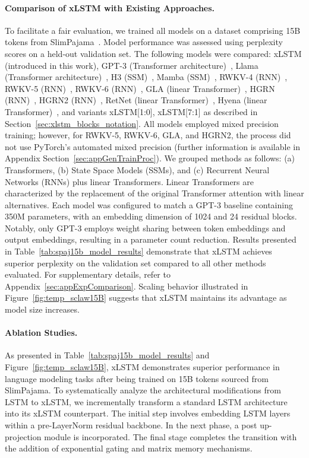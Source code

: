 \paragraph{Comparison of xLSTM with Existing Approaches.} To facilitate a fair evaluation, we trained all models on a dataset comprising 15B tokens from SlimPajama~\citep{Soboleva:23}. Model performance was assessed using perplexity scores on a held-out validation set. The following models were compared: xLSTM (introduced in this work), GPT-3 (Transformer architecture)~\citep{Brown:20short}, Llama (Transformer architecture)~\citep{Touvron:23arxiv}, H3 (SSM)~\citep{Fu:23}, Mamba (SSM)~\citep{Gu:24arxiv}, RWKV-4 (RNN)~\citep{Peng:23arxivshort}, RWKV-5 (RNN)~\citep{Peng:24arxivshort}, RWKV-6 (RNN)~\citep{Peng:24arxivshort}, GLA (linear Transformer)~\citep{Yang:23arxiv}, HGRN (RNN)~\citep{Qin:23}, HGRN2 (RNN)~\citep{Qin:24arxiv}, RetNet (linear Transformer)~\citep{Sun:23arxiv}, Hyena (linear Transformer)~\citep{Poli:23}, and variants xLSTM[1:0], xLSTM[7:1] as described in Section~\ref{sec:xlstm_blocks_notation}. 
All models employed mixed precision training; however, for RWKV-5, RWKV-6, GLA, and HGRN2, the process did not use PyTorch's automated mixed precision (further information is available in Appendix Section~\ref{sec:appGenTrainProc}).
We grouped methods as follows: (a) Transformers, (b) State Space Models (SSMs), and (c) Recurrent Neural Networks (RNNs) plus linear Transformers. Linear Transformers are characterized by the replacement of the original Transformer attention with linear alternatives. Each model was configured to match a GPT-3 baseline containing 350M parameters, with an embedding dimension of 1024 and 24 residual blocks. Notably, only GPT-3 employs weight sharing between token embeddings and output embeddings, resulting in a parameter count reduction. Results presented in Table~\ref{tab:spaj15b_model_results} demonstrate that xLSTM achieves superior perplexity on the validation set compared to all other methods evaluated. For supplementary details, refer to Appendix~\ref{sec:appExpComparison}.
Scaling behavior illustrated in Figure~\ref{fig:temp_sclaw15B} suggests that xLSTM maintains its advantage as model size increases.

\paragraph{Ablation Studies.}
As presented in Table~\ref{tab:spaj15b_model_results} and Figure~\ref{fig:temp_sclaw15B}, xLSTM demonstrates superior performance in language modeling tasks after being trained on 15B tokens sourced from SlimPajama. To systematically analyze the architectural modifications from LSTM to xLSTM, we incrementally transform a standard LSTM architecture into its xLSTM counterpart. The initial step involves embedding LSTM layers within a pre-LayerNorm residual backbone. In the next phase, a post up-projection module is incorporated. The final stage completes the transition with the addition of exponential gating and matrix memory mechanisms.

